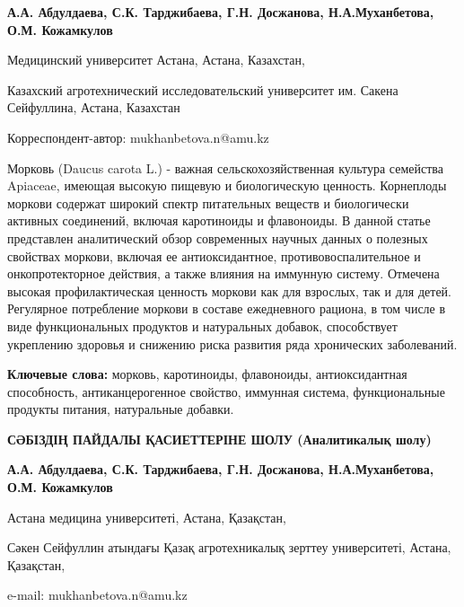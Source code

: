 
\begin{header}

{\bfseries
{}А.А. Абдулдаева,
С.К. Тарджибаева,
Г.Н. Досжанова,
Н.А.Муханбетова\envelope,
О.М. Кожамкулов
}
\end{header}

\begin{affil}
Медицинский университет Астана, Астана, Казахстан,

Казахский агротехнический исследовательский университет им. Сакена Сейфуллина, Астана, Казахстан

\envelope  Корреспондент-автор: mukhanbetova.n@amu.kz
\end{affil}

Морковь (Daucus carota L.) - важная сельскохозяйственная культура
семейства Apiaceae, имеющая высокую пищевую и биологическую ценность.
Корнеплоды моркови содержат широкий спектр питательных веществ и
биологически активных соединений, включая каротиноиды и флавоноиды. В
данной статье представлен аналитический обзор современных научных данных
о полезных свойствах моркови, включая ее антиоксидантное,
противовоспалительное и онкопротекторное действия, а также влияния на
иммунную систему. Отмечена высокая профилактическая ценность моркови как
для взрослых, так и для детей. Регулярное потребление моркови в составе
ежедневного рациона, в том числе в виде функциональных продуктов и
натуральных добавок, способствует укреплению здоровья и снижению риска
развития ряда хронических заболеваний.

{\bfseries Ключевые слова:} морковь, каротиноиды, флавоноиды,
антиоксидантная способность, антиканцерогенное свойство, иммунная
система, функциональные продукты питания, натуральные добавки.

\begin{header}
{\bfseries СӘБІЗДІҢ ПАЙДАЛЫ ҚАСИЕТТЕРІНЕ ШОЛУ (Аналитикалық шолу)}

{\bfseries
{}А.А. Абдулдаева,
С.К. Тарджибаева,
Г.Н. Досжанова,
Н.А.Муханбетова\envelope ,
О.М. Кожамкулов
}
\end{header}

\begin{affil}
Астана медицина университеті, Астана, Қазақстан,

Сәкен Сейфуллин атындағы Қазақ агротехникалық зерттеу университеті, Астана, Қазақстан,

e-mail: mukhanbetova.n@amu.kz
\end{affil}

